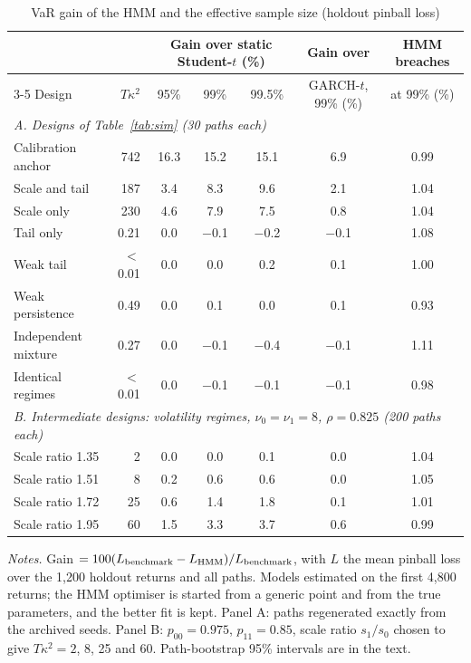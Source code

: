 \documentclass[12pt,letterpaper]{article}
\theoremstyle{plain}
\theoremstyle{remark}
\begin{document}
\begin{table}[ht]
\centering\footnotesize
\caption{VaR gain of the HMM and the effective sample size (holdout pinball loss)}\label{tab:varneff}
\setlength{\tabcolsep}{4pt}
\begin{tabular}{lrccccc}
\toprule
 & & \multicolumn{3}{c}{Gain over static Student-$t$ (\%)} & Gain over & HMM breaches\\
\cmidrule(lr){3-5}
Design & $T\kappa^2$ & 95\% & 99\% & 99.5\% & GARCH-$t$, 99\% (\%) & at 99\% (\%)\\
\midrule
\multicolumn{7}{l}{\emph{A. Designs of Table~\ref{tab:sim} (30 paths each)}}\\
Calibration anchor & 742 & 16.3 & 15.2 & 15.1 & 6.9 & 0.99\\
Scale and tail & 187 & 3.4 & 8.3 & 9.6 & 2.1 & 1.04\\
Scale only & 230 & 4.6 & 7.9 & 7.5 & 0.8 & 1.04\\
Tail only & 0.21 & 0.0 & $-$0.1 & $-$0.2 & $-$0.1 & 1.08\\
Weak tail & $<$0.01 & 0.0 & 0.0 & 0.2 & 0.1 & 1.00\\
Weak persistence & 0.49 & 0.0 & 0.1 & 0.0 & 0.1 & 0.93\\
Independent mixture & 0.27 & 0.0 & $-$0.1 & $-$0.4 & $-$0.1 & 1.11\\
Identical regimes & $<$0.01 & 0.0 & $-$0.1 & $-$0.1 & $-$0.1 & 0.98\\
\midrule
\multicolumn{7}{l}{\emph{B. Intermediate designs: volatility regimes, $\nu_0=\nu_1=8$, $\rho=0.825$ (200 paths each)}}\\
Scale ratio 1.35 & 2 & 0.0 & 0.0 & 0.1 & 0.0 & 1.04\\
Scale ratio 1.51 & 8 & 0.2 & 0.6 & 0.6 & 0.0 & 1.05\\
Scale ratio 1.72 & 25 & 0.6 & 1.4 & 1.8 & 0.1 & 1.01\\
Scale ratio 1.95 & 60 & 1.5 & 3.3 & 3.7 & 0.6 & 0.99\\
\bottomrule
\end{tabular}
\par\smallskip\footnotesize\emph{Notes.} Gain $=100(L_{\rm benchmark}-L_{\rm HMM})/L_{\rm benchmark}$, with $L$ the mean pinball loss over the 1{,}200 holdout returns and all paths. Models estimated on the first 4{,}800 returns; the HMM optimiser is started from a generic point and from the true parameters, and the better fit is kept. Panel A: paths regenerated exactly from the archived seeds. Panel B: $p_{00}=0.975$, $p_{11}=0.85$, scale ratio $s_1/s_0$ chosen to give $T\kappa^2=2$, 8, 25 and 60. Path-bootstrap 95\% intervals are in the text.
\end{table}
\end{document}
